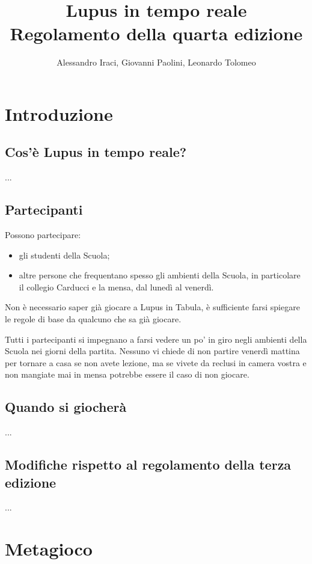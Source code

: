 \documentclass[a4paper,10pt]{article}
\title{Lupus in tempo reale\\ Regolamento della quarta edizione}
\author{Alessandro Iraci, Giovanni Paolini, Leonardo Tolomeo}
\begin{document}
\maketitle


\section{Introduzione}

\subsection{Cos'è Lupus in tempo reale?}
...

\subsection{Partecipanti}

Possono partecipare:
\begin{itemize}
 \item gli studenti della Scuola;
 \item altre persone che frequentano spesso gli ambienti della Scuola, in particolare il collegio Carducci e la mensa, dal lunedì al venerdì.
\end{itemize}

Non è necessario saper già giocare a Lupus in Tabula, è sufficiente farsi spiegare le regole di base da qualcuno che sa già giocare.

Tutti i partecipanti si impegnano a farsi vedere un po' in giro negli ambienti della Scuola nei giorni della partita. Nessuno vi chiede di non partire venerdì mattina per tornare a casa se non avete lezione, ma se vivete da reclusi in camera vostra e non mangiate mai in mensa potrebbe essere il caso di non giocare.


\subsection{Quando si giocherà}

...


\subsection{Modifiche rispetto al regolamento della terza edizione}

...


\pagebreak
\section{Metagioco}
\end{document}
